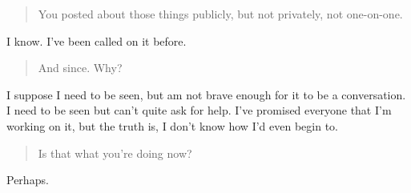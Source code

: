 \begin{quote}
You posted about those things publicly, but not privately, not one-on-one.
\end{quote}

I know. I've been called on it before.

\begin{quote}
And since. Why?
\end{quote}

I suppose I need to be seen, but am not brave enough for it to be a conversation. I need to be seen but can't quite ask for help. I've promised everyone that I'm working on it, but the truth is, I don't know how I'd even begin to.

\begin{quote}
Is that what you're doing now?
\end{quote}

Perhaps.
